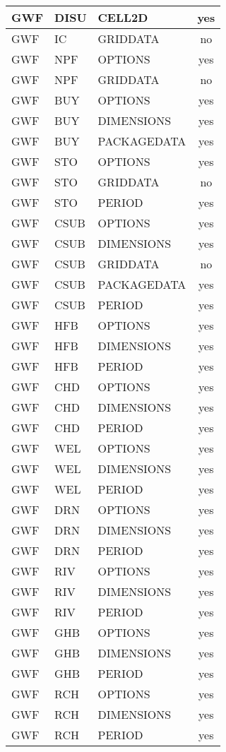 \begin{longtable}{p{1.5cm} p{1.5cm} p{3cm} c}
GWF & DISU & CELL2D & yes \\ 
\hline
GWF & IC & GRIDDATA & no \\ 
\hline
GWF & NPF & OPTIONS & yes \\ 
GWF & NPF & GRIDDATA & no \\ 
\hline
GWF & BUY & OPTIONS & yes \\ 
GWF & BUY & DIMENSIONS & yes \\ 
GWF & BUY & PACKAGEDATA & yes \\ 
\hline
GWF & STO & OPTIONS & yes \\ 
GWF & STO & GRIDDATA & no \\ 
GWF & STO & PERIOD & yes \\ 
\hline
GWF & CSUB & OPTIONS & yes \\ 
GWF & CSUB & DIMENSIONS & yes \\ 
GWF & CSUB & GRIDDATA & no \\ 
GWF & CSUB & PACKAGEDATA & yes \\ 
GWF & CSUB & PERIOD & yes \\ 
\hline
GWF & HFB & OPTIONS & yes \\ 
GWF & HFB & DIMENSIONS & yes \\ 
GWF & HFB & PERIOD & yes \\ 
\hline
GWF & CHD & OPTIONS & yes \\ 
GWF & CHD & DIMENSIONS & yes \\ 
GWF & CHD & PERIOD & yes \\ 
\hline
GWF & WEL & OPTIONS & yes \\ 
GWF & WEL & DIMENSIONS & yes \\ 
GWF & WEL & PERIOD & yes \\ 
\hline
GWF & DRN & OPTIONS & yes \\ 
GWF & DRN & DIMENSIONS & yes \\ 
GWF & DRN & PERIOD & yes \\ 
\hline
GWF & RIV & OPTIONS & yes \\ 
GWF & RIV & DIMENSIONS & yes \\ 
GWF & RIV & PERIOD & yes \\ 
\hline
GWF & GHB & OPTIONS & yes \\ 
GWF & GHB & DIMENSIONS & yes \\ 
GWF & GHB & PERIOD & yes \\ 
\hline
GWF & RCH & OPTIONS & yes \\ 
GWF & RCH & DIMENSIONS & yes \\ 
GWF & RCH & PERIOD & yes \\ 

\end{longtable}
